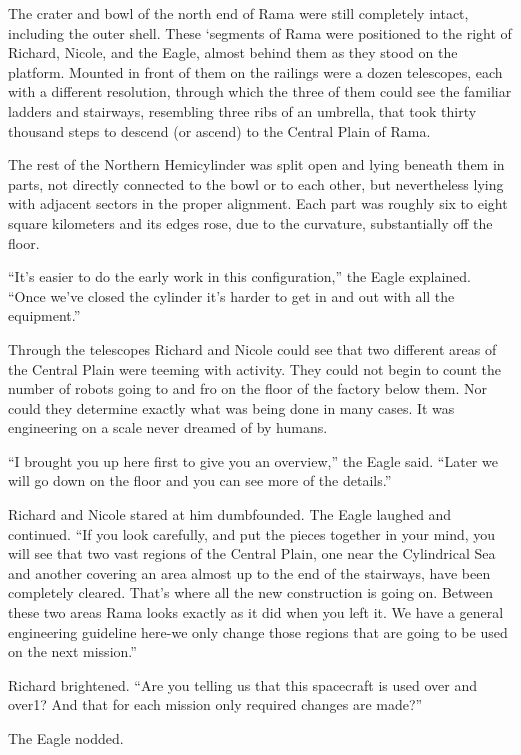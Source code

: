 \documentclass[]{article}
\begin{document}
{The crater and bowl of the north end of Rama were still completely intact, including the outer shell.  These ‘segments of Rama were positioned to the right of Richard, Nicole, and the Eagle, almost behind them as they stood on the platform.  Mounted in front of them on the railings were a dozen telescopes, each with a different resolution, through which the three of them could see the familiar ladders and stairways, resembling three ribs of an umbrella, that took thirty thousand steps to descend (or ascend) to the Central Plain of Rama.

The rest of the Northern Hemicylinder was split open and lying beneath them in parts, not directly connected to the bowl or to each other, but nevertheless lying with adjacent sectors in the proper alignment.  Each part was roughly six to eight square kilometers and its edges rose, due to the curvature, substantially off the floor.

“It’s easier to do the early work in this configuration,” the Eagle explained.  “Once we’ve closed the cylinder it’s harder to get in and out with all the equipment.”

Through the telescopes Richard and Nicole could see that two different areas of the Central Plain were teeming with activity.  They could not begin to count the number of robots going to and fro on the floor of the factory below them.  Nor could they determine exactly what was being done in many cases.  It was engineering on a scale never dreamed of by humans.

“I brought you up here first to give you an overview,” the Eagle said.  “Later we will go down on the floor and you can see more of the details.”

Richard and Nicole stared at him dumbfounded.  The Eagle laughed and continued.  “If you look carefully, and put the pieces together in your mind, you will see that two vast regions of the Central Plain, one near the Cylindrical Sea and another covering an area almost up to the end of the stairways, have been completely cleared.  That’s where all the new construction is going on.  Between these two areas Rama looks exactly as it did when you left it.  We have a general engineering guideline here-we only change those regions that are going to be used on the next mission.”

Richard brightened.  “Are you telling us that this spacecraft is used over and over1? And that for each mission only required changes are made?”

The Eagle nodded.

}
\end{document}
